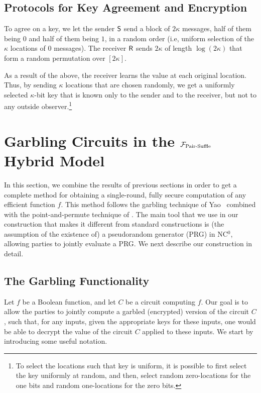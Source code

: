 \subsection{Protocols for Key Agreement and Encryption}\label{sec:keyAgreement}
To agree on a key, we let the sender $\mathsf{S}$ send a block of $2\kappa$ messages, half of them being $0$ and half of them being $1$, in a random order (i.e, uniform selection of the $\kappa$ locations of $0$ messages). The receiver $\mathsf{R}$ sends  
$2\kappa$ of length $\log(2\kappa)$ that form a random permutation over $[2\kappa]$.

As a result of the above, the receiver learns the value at each original location. Thus, by sending $\kappa$ locations that are chosen randomly, we get a uniformly selected $\kappa$-bit key that is known only to the sender and to the receiver, but not to any outside observer.\footnote{To select the locations such that key is uniform, it is possible to first select the key uniformly at random, and then, select random zero-locations for the one bits and random one-locations for the zero bits.}
\section{Garbling Circuits in the ${\cal F}_{\operatorname{Pair-Suffle}}$ Hybrid Model}\label{sec:Yaoprot} 
In this section, we combine the results of previous sections in order to get a complete method for obtaining a single-round, fully secure computation of any efficient function $f$. This method follows the garbling technique of Yao~\cite{Yao87} combined with the point-and-permute technique of \cite{BMR90}. The main tool that we use in our construction that makes it different from standard constructions is (the assumption of the existence of) a pseudorandom generator (PRG) in NC$^0$, allowing parties to jointly evaluate a PRG. We next describe our construction in detail.

\subsection{The Garbling Functionality}
Let $f$ be a Boolean function, and let $C$ be a circuit computing $f$. Our goal is to allow the parties to jointly compute a garbled (encrypted) version of the circuit $C$, such that, for any inputs, given the appropriate keys for these inputs, one would be able to decrypt the value of the circuit $C$ applied to these inputs. 
We start by introducing some useful notation. 

